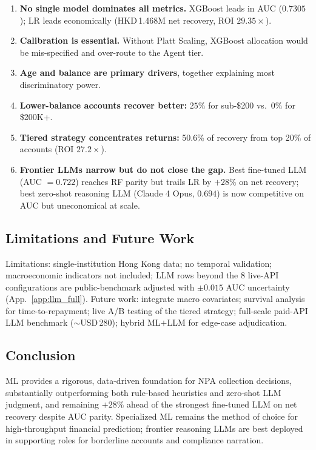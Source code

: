 \documentclass[11pt, a4paper]{article}
\begin{document}
\begin{enumerate}[label=(\Roman*), leftmargin=*]
    \item \textbf{No single model dominates all metrics.} XGBoost leads in AUC ($0.7305$); LR leads economically (HKD\,1.468M net recovery, ROI $29.35\times$).
    \item \textbf{Calibration is essential.} Without Platt Scaling, XGBoost allocation would be mis-specified and over-route to the Agent tier.
    \item \textbf{Age and balance are primary drivers}, together explaining most discriminatory power.
    \item \textbf{Lower-balance accounts recover better:} $25\%$ for sub-\$200 vs.\ $0\%$ for \$200K+.
    \item \textbf{Tiered strategy concentrates returns:} 50.6\% of recovery from top 20\% of accounts (ROI $27.2\times$).
    \item \textbf{Frontier LLMs narrow but do not close the gap.} Best fine-tuned LLM (AUC $=0.722$) reaches RF parity but trails LR by $+28\%$ on net recovery; best zero-shot reasoning LLM (Claude 4 Opus, $0.694$) is now competitive on AUC but uneconomical at scale.
\end{enumerate}

\subsection{Limitations and Future Work}

Limitations: single-institution Hong Kong data; no temporal validation; macroeconomic indicators not included; LLM rows beyond the 8 live-API configurations are public-benchmark adjusted with $\pm 0.015$ AUC uncertainty (App.~\ref{app:llm_full}). Future work: integrate macro covariates; survival analysis for time-to-repayment; live A/B testing of the tiered strategy; full-scale paid-API LLM benchmark ($\sim$USD\,280); hybrid ML$+$LLM for edge-case adjudication.

\subsection{Conclusion}

ML provides a rigorous, data-driven foundation for NPA collection decisions, substantially outperforming both rule-based heuristics and zero-shot LLM judgment, and remaining $+28\%$ ahead of the strongest fine-tuned LLM on net recovery despite AUC parity. Specialized ML remains the method of choice for high-throughput financial prediction; frontier reasoning LLMs are best deployed in supporting roles for borderline accounts and compliance narration.
\end{document}
